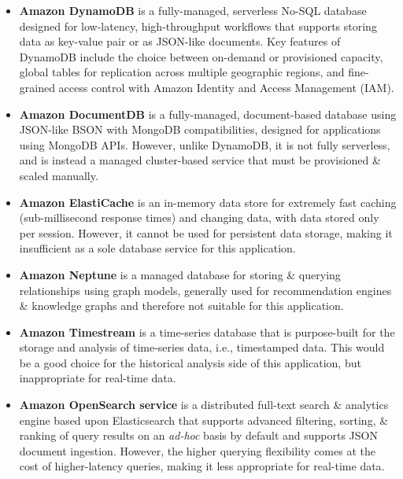 \documentclass[a4paper,11pt]{report}
\begin{document}
\begin{itemize}
    \item   \textbf{Amazon DynamoDB}\supercite{dynamodb} is a fully-managed, serverless No-SQL database designed for low-latency, high-throughput workflows that supports storing data as key-value pair or as JSON-like documents.
            Key features of DynamoDB include the choice between on-demand or provisioned capacity, global tables for replication across multiple geographic regions, and fine-grained access control with Amazon Identity and Access Management (IAM).

    \item   \textbf{Amazon DocumentDB}\supercite{documentdb} is a fully-managed, document-based database using JSON-like BSON with MongoDB compatibilities, designed for applications using MongoDB APIs.
            However, unlike DynamoDB, it is not fully serverless, and is instead a managed cluster-based service that must be provisioned \& scaled manually.

    \item   \textbf{Amazon ElastiCache}\supercite{elasticache} is an in-memory data store for extremely fast caching (sub-millisecond response times) and changing data, with data stored only per session.
            However, it cannot be used for persistent data storage, making it insufficient as a sole database service for this application.

    \item   \textbf{Amazon Neptune}\supercite{neptune} is a managed database for storing \& querying relationships using graph models, generally used for recommendation engines \& knowledge graphs and therefore not suitable for this application.

    \item   \textbf{Amazon Timestream}\supercite{timestream} is a time-series database that is purpose-built for the storage and analysis of time-series data, i.e., timestamped data.
            This would be a good choice for the historical analysis side of this application, but inappropriate for real-time data.

    \item   \textbf{Amazon OpenSearch service}\supercite{opensearch} is a distributed full-text search \& analytics engine based upon Elasticsearch that supports advanced filtering, sorting, \& ranking of query results on an \textit{ad-hoc} basis by default and supports JSON document ingestion.
            However, the higher querying flexibility comes at the cost of higher-latency queries, making it less appropriate for real-time data.
\end{itemize}
\end{document}
